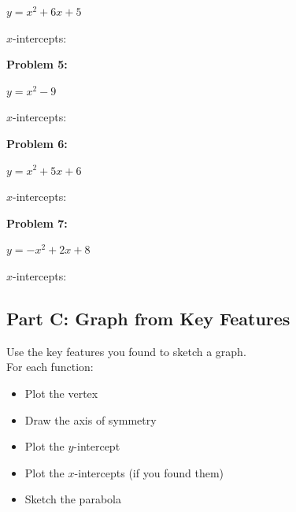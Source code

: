\documentclass[12pt]{article}
\begin{document}
            $y = x^2 + 6x + 5$

			\vspace{4cm}

			$x$-intercepts: \underline{\hspace{3in}}

			\vspace{1cm}

			\textbf{Problem 5:}
            
            $y = x^2 - 9$

			\vspace{4cm}

			$x$-intercepts: \underline{\hspace{3in}}

			\newpage

			\textbf{Problem 6:}
            
            $y = x^2 + 5x + 6$

			\vspace{4cm}

			$x$-intercepts: \underline{\hspace{3in}}

			\vspace{1cm}

			\textbf{Problem 7:}
            
            $y = -x^2 + 2x + 8$

			\vspace{4cm}

			$x$-intercepts: \underline{\hspace{3in}}

			\newpage

		\subsection*{Part C: Graph from Key Features}

			Use the key features you found to sketch a graph.\\

			For each function:
			\begin{itemize}
				\item Plot the vertex
				\item Draw the axis of symmetry
				\item Plot the $y$-intercept
				\item Plot the $x$-intercepts (if you found them)
				\item Sketch the parabola
			\end{itemize}
\end{document}
